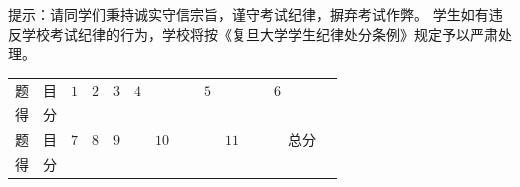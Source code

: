 \begin{center}

\end{center}

\qquad 提示：请同学们秉持诚实守信宗旨，谨守考试纪律，摒弃考试作弊。
学生如有违反学校考试纪律的行为，学校将按《复旦大学学生纪律处分条例》规定予以严肃处理。

\begin{table}
\begin{tabular}{|c|c|c|c|}
题\ \ 目 &\quad$1$\quad&\quad$2$\quad&\quad$3$\quad&\quad$4$\quad&\quad$5$\quad&\quad$6$\quad\\
得\ \ 分 & & & & & & \\
题\ \ 目 &\quad$7$\quad&\quad$8$\quad&\quad$9$\quad&\ \ \ $10$\ \ \ &\ \ \ $11$\ \ \ &\ \ 总分\ \ \\
得\ \ 分 & & & & & & 
\end{tabular}
\end{table}

